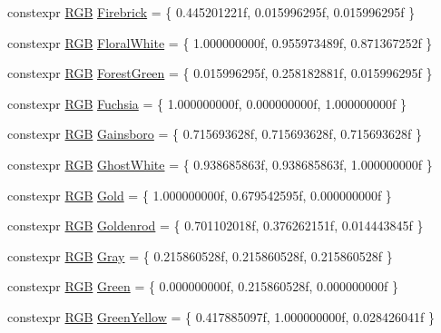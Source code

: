 \begin{DoxyCompactItemize}
\item 
constexpr \mbox{\hyperlink{structmage_1_1_r_g_b}{R\+GB}} \mbox{\hyperlink{namespacemage_1_1color_add7b65bdb6d5f690222f8be205a5b028}{Firebrick}} = \{ 0.\+445201221f, 0.\+015996295f, 0.\+015996295f \}
\item 
constexpr \mbox{\hyperlink{structmage_1_1_r_g_b}{R\+GB}} \mbox{\hyperlink{namespacemage_1_1color_a1dd66768142140e9ee68a95e5981c44a}{Floral\+White}} = \{ 1.\+000000000f, 0.\+955973489f, 0.\+871367252f \}
\item 
constexpr \mbox{\hyperlink{structmage_1_1_r_g_b}{R\+GB}} \mbox{\hyperlink{namespacemage_1_1color_a9b90455f4354a6d6963486c472bc33be}{Forest\+Green}} = \{ 0.\+015996295f, 0.\+258182881f, 0.\+015996295f \}
\item 
constexpr \mbox{\hyperlink{structmage_1_1_r_g_b}{R\+GB}} \mbox{\hyperlink{namespacemage_1_1color_a5a36bb041d4344c2111b15294ba0d15f}{Fuchsia}} = \{ 1.\+000000000f, 0.\+000000000f, 1.\+000000000f \}
\item 
constexpr \mbox{\hyperlink{structmage_1_1_r_g_b}{R\+GB}} \mbox{\hyperlink{namespacemage_1_1color_a1caedc498561f07c9ee98360cd32e0cf}{Gainsboro}} = \{ 0.\+715693628f, 0.\+715693628f, 0.\+715693628f \}
\item 
constexpr \mbox{\hyperlink{structmage_1_1_r_g_b}{R\+GB}} \mbox{\hyperlink{namespacemage_1_1color_a6e3a848fd12f965953fa38d355e20ab5}{Ghost\+White}} = \{ 0.\+938685863f, 0.\+938685863f, 1.\+000000000f \}
\item 
constexpr \mbox{\hyperlink{structmage_1_1_r_g_b}{R\+GB}} \mbox{\hyperlink{namespacemage_1_1color_a72d35eacf778a3576ddb3d3c4d8930f0}{Gold}} = \{ 1.\+000000000f, 0.\+679542595f, 0.\+000000000f \}
\item 
constexpr \mbox{\hyperlink{structmage_1_1_r_g_b}{R\+GB}} \mbox{\hyperlink{namespacemage_1_1color_aebd4f6050ceb4c380fc13cc7d3302888}{Goldenrod}} = \{ 0.\+701102018f, 0.\+376262151f, 0.\+014443845f \}
\item 
constexpr \mbox{\hyperlink{structmage_1_1_r_g_b}{R\+GB}} \mbox{\hyperlink{namespacemage_1_1color_a43f3c4cf9713fb15ed89dec2c9d26556}{Gray}} = \{ 0.\+215860528f, 0.\+215860528f, 0.\+215860528f \}
\item 
constexpr \mbox{\hyperlink{structmage_1_1_r_g_b}{R\+GB}} \mbox{\hyperlink{namespacemage_1_1color_a063b467cc0e16aa4a291c38307a21bc0}{Green}} = \{ 0.\+000000000f, 0.\+215860528f, 0.\+000000000f \}
\item 
constexpr \mbox{\hyperlink{structmage_1_1_r_g_b}{R\+GB}} \mbox{\hyperlink{namespacemage_1_1color_a28c20da179750abce432ec6439426338}{Green\+Yellow}} = \{ 0.\+417885097f, 1.\+000000000f, 0.\+028426041f \}

\end{DoxyCompactItemize}
